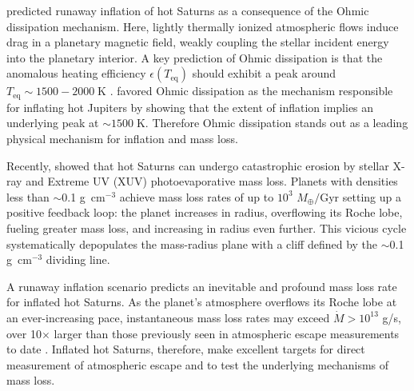 \documentclass[twocolumn]{aastex631}
\begin{document}
\citet{2011ApJ...738....1B} predicted runaway inflation of hot Saturns as a consequence of the Ohmic dissipation mechanism.  Here, lightly thermally ionized atmospheric flows induce drag in a planetary magnetic field, weakly coupling the stellar incident energy into the planetary interior.  A key prediction of Ohmic dissipation is that the anomalous heating efficiency $\epsilon(T_\mathrm{eq})$ should exhibit a peak around $T_\mathrm{eq}\sim1500-2000\;$K \citep{2012ApJ...745..138M,2014ApJ...794..132R,2016ApJ...819..116G}. \citet{2018AJ....155..214T} favored Ohmic dissipation as the mechanism responsible for inflating hot Jupiters by showing that the extent of inflation implies an underlying peak at $\sim1500\;$K.  Therefore Ohmic dissipation stands out as a leading physical mechanism for inflation and mass loss.

Recently, \citet{2023ApJ...945L..36T} showed that hot Saturns can undergo catastrophic erosion by stellar X-ray and Extreme UV (XUV) photoevaporative mass loss. Planets with densities less than $\sim$0.1 g~cm$^{-3}$ achieve mass loss rates of up to $10^3$ $M_\oplus /$Gyr setting up a positive feedback loop: the planet increases in radius, overflowing its Roche lobe, fueling greater mass loss, and increasing in radius even further.  This vicious cycle systematically depopulates the mass-radius plane with a cliff defined by the $\sim$0.1 g~cm$^{-3}$ dividing line.

A runaway inflation scenario predicts an inevitable and profound mass loss rate for inflated hot Saturns.  As the planet's atmosphere overflows its Roche lobe at an ever-increasing pace, instantaneous mass loss rates may exceed $\dot{M}>10^{13}$ g/s, over 10$\times$ larger than those previously seen in atmospheric escape measurements to date \citep{2022arXiv221116243D}.  Inflated hot Saturns, therefore, make excellent targets for direct measurement of atmospheric escape and to test the underlying mechanisms of mass loss.
\end{document}
